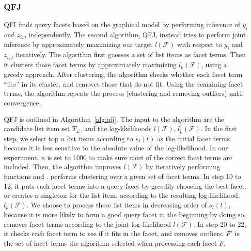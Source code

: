 \subsubsection{QFJ}
QFI finds query facets based on the graphical model by performing inference of $y_i$ and $z_{i,j}$ independently.
The second algorithm, QFJ, instead tries to perform joint inference by approximately maximizing our target $l(\mathcal{F})$ with respect to  $y_i$ and $z_{i,j}$ iteratively.
The algorithm first guesses a set of list items as facet terms.
Then it clusters those facet terms by approximately maximizing $l_p(\mathcal{F})$, using a greedy approach. 
After clustering, the algorithm checks whether each facet term ``fits'' in its cluster, and removes those that do not fit.
Using the remaining facet terms, the algorithm repeats the process (clustering and removing outliers) until convergence.

QFJ is outlined in Algorithm~\ref{alg:qfj}. The input to the algorithm are the candidate list item set $T_{\mathcal{L}}$,
and the log-likelihoods $l(\mathcal{F})$, $l_p(\mathcal{F})$.
In the first step, we select top $n$ list items according to $s_t(t)$ as the initial facet terms, because it is less sensitive to the absolute value of the log-likelihood.
In our experiment, $n$ is set to 1000 to make sure most of the correct facet terms are included.
Then, the algorithm improves $l(\mathcal{F})$ by iteratively performing functions  and .
 performs clustering over a given set of facet terms.
In step 10 to 12, it puts each facet terms into a query facet by greedily choosing the best facet, or creates a singleton for the list item, according to the resulting log-likelihood, $l_p(\mathcal{F})$.
We choose to process these list items in decreasing order of $s_t(t)$, because it is more likely to form a good query facet in the beginning by doing so.
 removes facet terms according to the joint log-likelihood $l(\mathcal{F})$.
In step 20 to 22, it checks each facet term to see if it fits in the facet, and removes outliers.
$F'$ is the set of facet terms the algorithm selected when processing each facet $F$.

